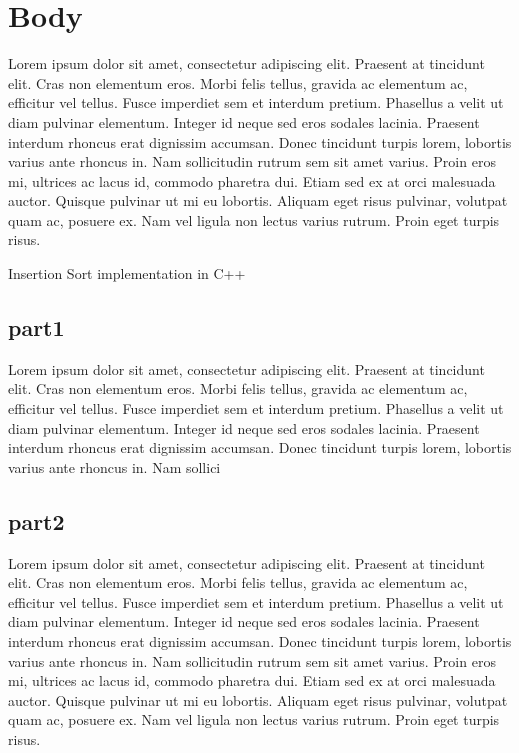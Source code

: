 \documentclass[12pt]{article}
\begin{document}
	\section{Body}
	Lorem ipsum dolor sit amet, consectetur adipiscing elit. Praesent at tincidunt elit. Cras non elementum eros. Morbi felis tellus, gravida ac elementum ac, efficitur vel tellus. Fusce imperdiet sem et interdum pretium. Phasellus a velit ut diam pulvinar elementum. Integer id neque sed eros sodales lacinia. Praesent interdum rhoncus erat dignissim accumsan. Donec tincidunt turpis lorem, lobortis varius ante rhoncus in. Nam sollicitudin rutrum sem sit amet varius. Proin eros mi, ultrices ac lacus id, commodo pharetra dui. Etiam sed ex at orci malesuada auctor. Quisque pulvinar ut mi eu lobortis. Aliquam eget risus pulvinar, volutpat quam ac, posuere ex. Nam vel ligula non lectus varius rutrum. Proin eget turpis risus.
	
		\begin{Snippet}
			
			\caption[Insertion Sort]{Insertion Sort implementation in C++}	
		\end{Snippet}
	
	\subsection{part1}
	Lorem ipsum dolor sit amet, consectetur adipiscing elit. Praesent at tincidunt elit. Cras non elementum eros. Morbi felis tellus, gravida ac elementum ac, efficitur vel tellus. Fusce imperdiet sem et interdum pretium. Phasellus a velit ut diam pulvinar elementum. Integer id neque sed eros sodales lacinia. Praesent interdum rhoncus erat dignissim accumsan. Donec tincidunt turpis lorem, lobortis varius ante rhoncus in. Nam sollici
	
	
	\subsection{part2}
	Lorem ipsum dolor sit amet, consectetur adipiscing elit. Praesent at tincidunt elit. Cras non elementum eros. Morbi felis tellus, gravida ac elementum ac, efficitur vel tellus. Fusce imperdiet sem et interdum pretium. Phasellus a velit ut diam pulvinar elementum. Integer id neque sed eros sodales lacinia. Praesent interdum rhoncus erat dignissim accumsan. Donec tincidunt turpis lorem, lobortis varius ante rhoncus in. Nam sollicitudin rutrum sem sit amet varius. Proin eros mi, ultrices ac lacus id, commodo pharetra dui. Etiam sed ex at orci malesuada auctor. Quisque pulvinar ut mi eu lobortis. Aliquam eget risus pulvinar, volutpat quam ac, posuere ex. Nam vel ligula non lectus varius rutrum. Proin eget turpis risus.
	
\end{document}
